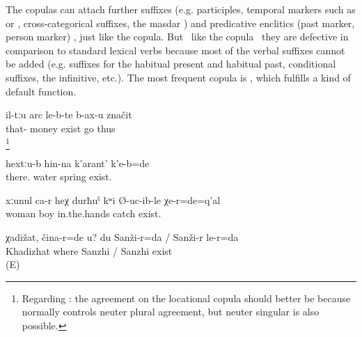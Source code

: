 The copulas can attach further suffixes (e.g. participles, temporal markers such as  or , cross-categorical suffixes, the masdar )  and predicative enclitics (past marker, person marker) , just like the copula. But \tnd\ like the copula \tnd\ they are defective in comparison to standard lexical verbs because most of the verbal suffixes cannot be added (e.g. suffixes for the habitual present and habitual past, conditional suffixes, the infinitive, etc.). The most frequent copula is , which fulfills a kind of default function.
%
\begin{exe}
	\ex	\label{ex:This means that (people) go where the money is}
	\gll	il-tːu	arc	le-b-te 	b-ax-u	značit\\
		that-	money	exist 	go	thus\\
	\glt	{}\footnote{Regarding : the agreement on the locational copula should better be  because   normally controls neuter plural agreement, but neuter singular is also possible.}

	\ex	\label{ex:There was a spring up there}
	\gll	hextːu-b	hin-na	k'arant'	k'e-b=de\\
		there.	water	spring	exist.\\
	\glt	{}

	\ex	\label{ex:That is the woman, the one who was keeping the boy in here hands}
	\gll	xːunul	ca-r	heχ	durħuˁ	kʷi	Ø-uc-ib-le	χe-r=de=q'al\\
		woman			boy	in.the.hands	catch	exist.\\
	\glt	{}

	\ex	\label{ex:‎Khadizhat, where are you? I am in Sanzhi_1}
	\gll	χadižat,	čina-r=de	u?	du	Sanži-r=da	/	Sanži-r	le-r=da\\
		Khadizhat	where			Sanzhi	/ Sanzhi exist\\
	\glt	{} (E)

\end{exe}

